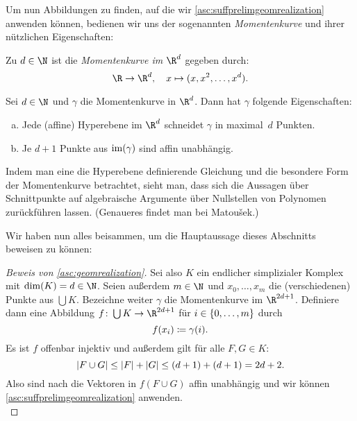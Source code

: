 Um nun Abbildungen zu finden, auf die wir \cref{asc:suffprelimgeomrealization}
anwenden können, bedienen wir uns der sogenannten \emph{Momentenkurve} und ihrer
nützlichen Eigenschaften:

\begin{thDef}[Momentenkurve]
    Zu $d\in\N$ ist die \emph{Momentenkurve im $\R^d$} gegeben durch:
    \[  \R \to \R^d, \quad x\mapsto (x,x^2,\ldots,x^d)  . \]
\end{thDef}

\begin{thLemma}
    \label{asc:momentumcurveprop}
    Sei $d\in\N$ und $\gamma$ die Momentenkurve in $\R^d$. Dann hat $\gamma$
    folgende Eigenschaften:
    \begin{enumerate}[a)]
        \item
            Jede (affine) Hyperebene im $\R^d$ schneidet $\gamma$ 
            in maximal~$d$ Punkten.
        \item\label{asc:momentumcurveprop:pointsaffinlyindependent}
            Je $d+1$ Punkte aus $\operatorname{im}(\gamma)$ sind affin unabhängig.
    \end{enumerate}
\end{thLemma}

\begin{proofsketch}
    Indem man eine die Hyperebene definierende Gleichung und die besondere Form
    der Momentenkurve betrachtet, sieht man, dass sich die Aussagen über
    Schnittpunkte auf algebraische Argumente über Nullstellen von Polynomen
    zurückführen lassen. (Genaueres findet man bei 
    Matou\v sek\cite[Ch.\,1,.4]{bookc:matousek03}.)
    \\
\end{proofsketch}

Wir haben nun alles beisammen, um die Hauptaussage dieses Abschnitts beweisen zu
können:
\begin{proof}[Beweis von \cref{asc:geomrealization}]
    Sei also $K$ ein endlicher simplizialer Komplex mit $\dim(K)=d\in\N$.
    Seien außerdem $m\in\N$ und $x_0,\ldots,x_m$ die (verschiedenen) Punkte
    aus $\bigcup K$. Bezeichne weiter $\gamma$ die Momentenkurve im $\R^{2d+1}$.
    Definiere dann eine Abbildung
    $f\colon \bigcup K\to\R^{2d+1}$ für $i\in\{0,\ldots,m\}$ durch 
    \[ f(x_i) \coloneqq \gamma(i) 
    . \]
    Es ist $f$ offenbar injektiv und außerdem gilt für alle $F,G\in K$:
    \[ \lvert F\cup G\rvert \leq \lvert F\rvert+\lvert G\rvert \leq (d+1)+(d+1) = 2d+2  . \]
    Also sind nach 
    die Vektoren in $f(F\cup G)$ affin unabhängig und wir können
    \cref{asc:suffprelimgeomrealization} anwenden.
    \\
\end{proof}


